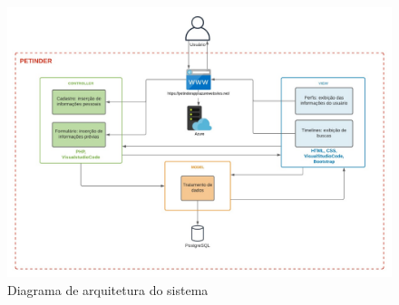 \begin{figure}[htb]
    \centering
	\includegraphics[width=1\textwidth]{imagens/diagrama_de_arquitetura.jpg}
	\caption{\label{fig_diagrama}Diagrama de arquitetura do sistema}
\end{figure}

